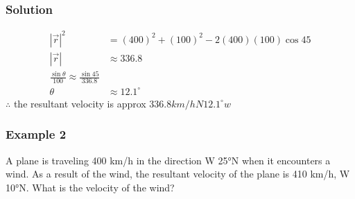 \documentclass{article}
\begin{document}
\begin{multicols}{2}

\columnbreak

\subsubsection*{Solution}
\begin{align*}
    |\vec{r}|^2&=(400)^2+(100)^2-2(400)(100)\cos 45\\
    |\vec{r}|&\approx 336.8\\
    \frac{\sin \theta}{100}\approx \frac{\sin 45}{336.8}\\
    \theta &\approx 12.1^{\circ}
\end{align*}
$\therefore$ the resultant velocity is approx $336.8 km/h N 12.1^{\circ}w$

\end{multicols}

\subsubsection*{Example 2}
A plane is traveling 400 km/h in the direction W 25°N when it encounters a wind. As a result of the wind, the resultant velocity of the plane is 410 km/h, W 10°N. What is the velocity of the wind?
\end{document}
